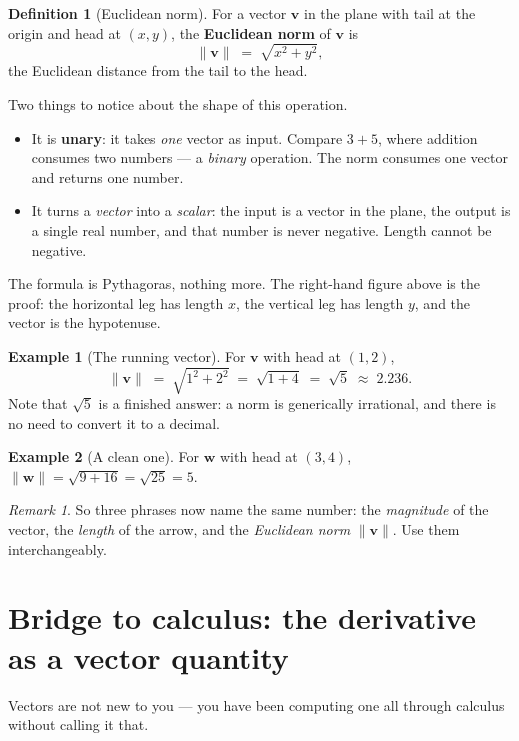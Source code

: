 \documentclass[11pt]{article}
\theoremstyle{definition}
\newtheorem{defn}{Definition}[section]
\newtheorem{ex}{Example}[section]
\theoremstyle{remark}
\newtheorem*{rmk}{Remark}
\newcommand{\vc}[1]{\mathbf{#1}}
\newcommand{\norm}[1]{\lVert #1\rVert}
\begin{document}
\begin{defn}[Euclidean norm]
For a vector $\vc{v}$ in the plane with tail at the origin and head at $(x,y)$,
the \textbf{Euclidean norm} of $\vc{v}$ is
\[
  \norm{\vc{v}} \;=\; \sqrt{x^{2}+y^{2}},
\]
the Euclidean distance from the tail to the head.
\end{defn}

Two things to notice about the shape of this operation.

\begin{itemize}[leftmargin=1.4em,itemsep=3pt]
  \item It is \textbf{unary}: it takes \emph{one} vector as input. Compare $3+5$,
        where addition consumes two numbers --- a \emph{binary} operation. The
        norm consumes one vector and returns one number.
  \item It turns a \emph{vector} into a \emph{scalar}: the input is a vector in
        the plane, the output is a single real number, and that number is never
        negative. Length cannot be negative.
\end{itemize}

\noindent The formula is Pythagoras, nothing more. The right-hand figure above
is the proof: the horizontal leg has length $x$, the vertical leg has length
$y$, and the vector is the hypotenuse.

\begin{ex}[The running vector]
For $\vc{v}$ with head at $(1,2)$,
\[
  \norm{\vc{v}} \;=\; \sqrt{1^{2}+2^{2}} \;=\; \sqrt{1+4} \;=\; \sqrt{5}
  \;\approx\; 2.236.
\]
Note that $\sqrt{5}$ is a finished answer: a norm is generically irrational, and
there is no need to convert it to a decimal.
\end{ex}

\begin{ex}[A clean one]
For $\vc{w}$ with head at $(3,4)$,
$\norm{\vc{w}}=\sqrt{9+16}=\sqrt{25}=5$.
\end{ex}

\begin{rmk}
So three phrases now name the same number: the \emph{magnitude} of the vector,
the \emph{length} of the arrow, and the \emph{Euclidean norm} $\norm{\vc{v}}$.
Use them interchangeably.
\end{rmk}

\section{Bridge to calculus: the derivative as a vector quantity}
Vectors are not new to you --- you have been computing one all through calculus
without calling it that.
\end{document}
